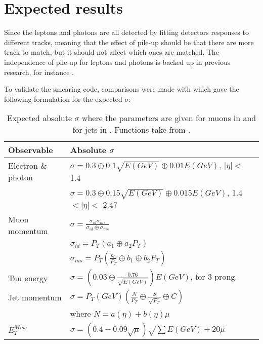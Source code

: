 \section{Expected results}\label{cha:vali:sec:expr}
Since the leptons and photons are all detected by fitting detectors responses to different tracks, meaning that the effect of pile-up should be that there are more track to match, but it should not affect which ones are matched. The independence of pile-up for leptons and photons is backed up in previous research, for instance \citep{Electronperf:2011, ATLAS:LOI2}.

To validate the smearing code, comparisons were made with \citep{ATL-PHYS-PUB-2013-004} which gave the following formulation for the expected $\sigma$: 
\begin{table}[H]
\renewcommand{\arraystretch}{1.5} %
\begin{center}
\begin{tabular}{|l|l|}
\hline
Observable & Absolute $\sigma$ \\ \hline
Electron \& photon & $\sigma=0.3\oplus 0.1\sqrt{E(GeV)}\oplus 0.01E(GeV)$, $|\eta|<$ 1.4 \\
& $\sigma=0.3\oplus 0.15\sqrt{E(GeV)}\oplus 0.015E(GeV)$, 1.4 $<|\eta|<$ 2.47 \\ \hline 
Muon momentum& $\sigma=\frac{\sigma_{id} \sigma_{ms}}{\sigma_{id} \oplus \sigma_{ms}}$\\
& $\sigma_{id}=P_T(a_1 \oplus a_2 P_T)$\\
& $\sigma_{ms}=P_T(\frac{b_0}{P_T} \oplus b_1 \oplus b_2 P_T)$\\ \hline
Tau energy& $\sigma =(0.03\oplus \frac{0.76}{\sqrt{E(GeV)}})E(GeV)$, for 3 prong.\\ \hline
Jet momentum& $\sigma = P_T(GeV)(\frac{N}{P_T} \oplus \frac{S}{\sqrt{P_T}} \oplus C)$ \\ 
& where $N=a(\eta)+b(\eta)\mu$ \\ \hline
$E_T^{Miss}$ & $\sigma = (0.4+0.09\sqrt{\mu})\sqrt{\sum E(GeV)+20\mu}$ \\ \hline
\end{tabular}
\end{center}
\renewcommand{\arraystretch}{1.0} %
\caption{Expected absolute $\sigma$ where the parameters are given for muons in  and for jets in . Functions take from \citep{ATL-PHYS-PUB-2013-004}.}
\label{tab:expected sigma}
\end{table}
